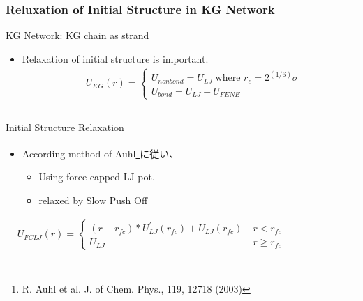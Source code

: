 \documentclass[12pt, dvipdfmx]{beamer}
\begin{document}
\begin{frame}
    \frametitle{Reluxation of Initial Structure in KG Network}
        \vspace{-2mm}
		\begin{block}{KG Network: KG chain as strand}
			\begin{itemize}
				\item \alert{Relaxation of initial structure} is important.
					\fontsize{6pt}{0pt}
					\begin{align*}
						&U_{KG}(r) = 
						\begin{cases}
						U_{nonbond} = U_{LJ} \;\text{where } r_c = 2^{(1/6)}\sigma \\
						U_{bond} = U_{LJ} + U_{FENE}
						\end{cases} 
					\end{align*}
			\end{itemize}
		\end{block}
		\vspace{-3mm}
		\begin{columns}[T, onlytextwidth]
				\begin{exampleblock}{Initial Structure Relaxation}
					\begin{itemize}
						\item According method of Auhl\footnote{
							\scriptsize{R. Auhl et al. J. of Chem. Phys., 119, 12718 (2003)}
						}に従い、
						\begin{itemize}
							\item Using force-capped-LJ pot.
							\item relaxed by Slow Push Off
						\end{itemize}
					\end{itemize}
					\fontsize{6pt}{0pt}
					\begin{align*}
						&U_{FCLJ}(r) = 
						\begin{cases}
						(r-r_{fc})*U_{LJ}^{\prime}(r_{fc}) + U_{LJ}(r_{fc}) \; &r< r_{fc} \\
						U_{LJ}   \;\;\;\;\;\;\; &r \geq r_{fc}
						\end{cases} 
					\end{align*}
				\end{exampleblock}
				\vspace{2mm}
				\begin{center}

\end{center}
\end{columns}
\end{frame}
\end{document}
